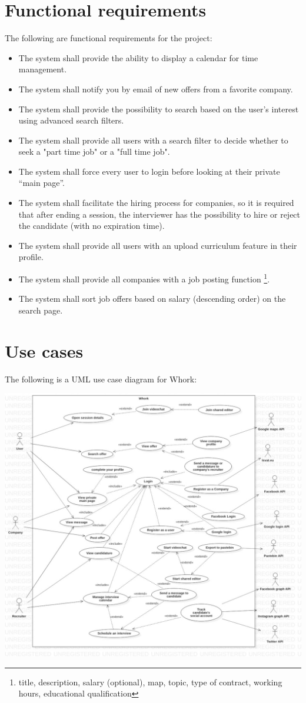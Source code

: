 \documentclass[12pt, a4paper]{article}
\begin{document}
\newpage
\section{Functional requirements}
The following are functional requirements for the project:
\begin{itemize}
	\item The system shall provide the ability to display a calendar for time management.
	\item The system shall notify you by email of new offers from a favorite company.
	\item The system shall provide the possibility to search based on the user's interest using advanced search filters.
	\item The system shall provide all users with a search filter to decide whether to seek a
	"part time job" or a "full time job".
	\item The system shall force every user to login before looking at their private “main page”.
	\item The system shall facilitate the hiring process for companies, so it is required that after ending a session, 
	the interviewer has the possibility to hire or reject the candidate (with no expiration time).
	\item The system shall provide all users with an upload curriculum feature in their profile.
	\item The system shall provide all companies with a job posting function
	\footnote{title, description, salary (optional), map, topic, type of contract, working hours, educational qualification}.
	\item The system shall sort job offers based on salary (descending order) on the search page.
\end{itemize}

\newpage
\section{Use cases}
The following is a UML use case diagram for Whork:

\includegraphics{diagrams/project/usecase_scaled.jpg}
\end{document}
